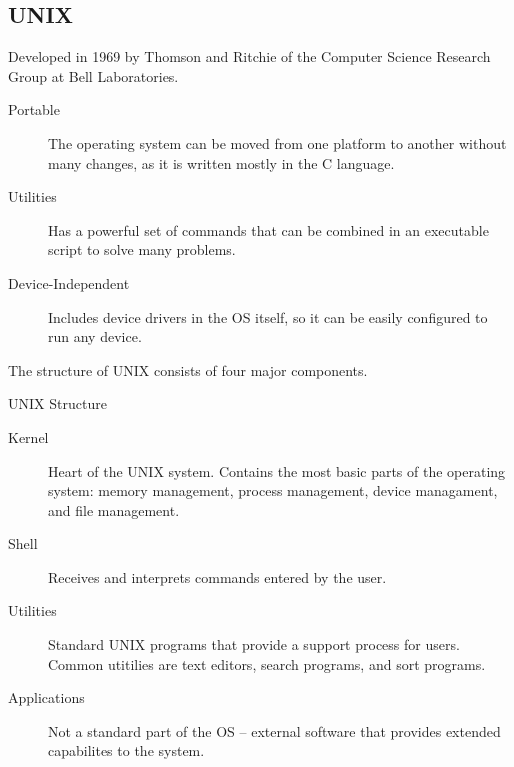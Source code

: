 \documentclass[\main/notes.tex]{subfiles}
\begin{document}
			\subsection{UNIX}
				Developed in 1969 by Thomson and Ritchie of the Computer Science Research Group at Bell Laboratories.
				\begin{indentparagraph}
					\begin{description}
						\item[Portable] The operating system can be moved from one platform to another without many changes, as it is written mostly in the C language.
						\item[Utilities] Has a powerful set of commands that can be combined in an executable script to solve many problems.
						\item[Device-Independent] Includes device drivers in the OS itself, so it can be easily configured to run any device.
					\end{description}
				\end{indentparagraph}
				The structure of UNIX consists of four major components.
				\begin{definition}{UNIX Structure}
					\begin{description}
						\item[Kernel] Heart of the UNIX system. Contains the most basic parts of the operating system: memory management, process management, device managament, and file management.
						\item[Shell] Receives and interprets commands entered by the user.
						\item[Utilities] Standard UNIX programs that provide a support process for users. Common utitilies are text editors, search programs, and sort programs.
						\item[Applications] Not a standard part of the OS -- external software that provides extended capabilites to the system.
					\end{description}
				\end{definition}
\end{document}
